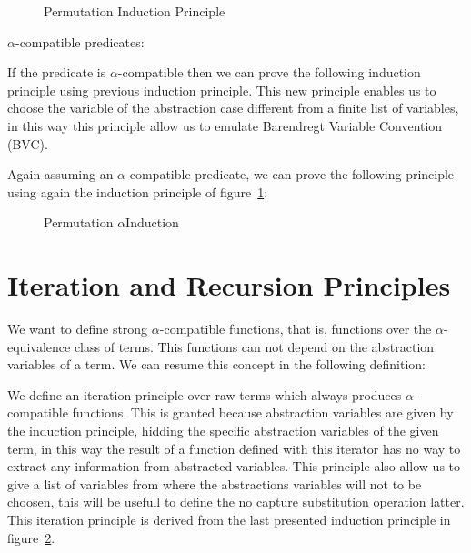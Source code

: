 \documentclass{article}
\newcommand{\alp}{\ensuremath{\alpha}}
\begin{document}
\begin{figure}[!ht]
  \caption{Permutation Induction Principle}
\label{fig:permInd}
\end{figure}

\alp-compatible predicates:

 \hspace{5px}

If the predicate is \alp-compatible then we can prove the following induction principle using previous  induction principle. This new principle enables us to choose the variable of the abstraction case different from a finite list of variables, in this way this principle allow us to emulate Barendregt Variable Convention (BVC).

 \hspace{5px}

Again assuming an \alp-compatible predicate, we can prove the following principle using again the induction principle of figure~\ref{fig:permInd}:

\begin{figure}[!ht]
  \caption{Permutation \alp Induction}
\label{fig:permAlphaInd}
\end{figure}

\section{Iteration and Recursion Principles}
\label{sec:recursion}

We want to define strong \alp-compatible functions, that is, functions over the \alp-equivalence class of terms. This functions can not depend on the abstraction variables of a term. We can resume this concept in the following definition:

 \hspace{5px}

We define an iteration principle over raw terms which always produces \alp-compatible functions. This is granted because abstraction variables are given by the induction principle, hidding the specific abstraction variables of the given term, in this way the result of a function defined with this iterator has no way to extract any information from abstracted variables. This principle also allow us to give a list of variables from where the abstractions variables will not to be choosen, this will be usefull to define the no capture substitution operation latter. This iteration principle is derived from the last presented induction principle in figure~\ref{fig:permAlphaInd}. 
\end{document}
